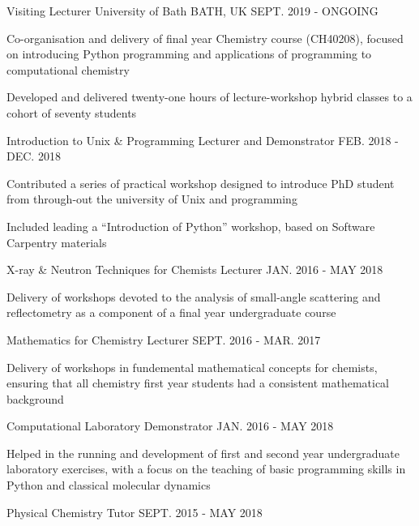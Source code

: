 \begin{cventries}
	\cventry
	{Visiting Lecturer}
	{University of Bath}
	{BATH, UK}
	{SEPT. 2019 - ONGOING}
	{
		\begin{cvitems}
			\item {Co-organisation and delivery of final year Chemistry course (CH40208), focused on introducing Python programming and applications of programming to computational chemistry}
			\item {Developed and delivered twenty-one hours of lecture-workshop hybrid classes to a cohort of seventy students}
		\end{cvitems}
	}
	\cventry
	{Introduction to Unix \& Programming Lecturer and Demonstrator}
	{}
	{}
	{FEB. 2018 - DEC. 2018}
	{
		\begin{cvitems}
			\item {Contributed a series of practical workshop designed to introduce PhD student from through-out the university of Unix and programming}
			\item {Included leading a ``Introduction of Python'' workshop, based on Software Carpentry materials}
		\end{cvitems}
	}
	\cventry
	{X-ray \& Neutron Techniques for Chemists Lecturer}
	{}
	{}
	{JAN. 2016 - MAY 2018}
	{
		\begin{cvitems}
			\item {Delivery of workshops devoted to the analysis of small-angle scattering and reflectometry as a component of a final year undergraduate course}
		\end{cvitems}
	}
	\cventry
	{Mathematics for Chemistry Lecturer}
	{}
	{}
	{SEPT. 2016 - MAR. 2017}
	{
		\begin{cvitems}
			\item {Delivery of workshops in fundemental mathematical concepts for chemists, ensuring that all chemistry first year students had a consistent mathematical background}
		\end{cvitems}
	}
	\cventry
	{Computational Laboratory Demonstrator}
	{}
	{}
	{JAN. 2016 - MAY 2018}
	{
		\begin{cvitems}
			\item {Helped in the running and development of first and second year undergraduate laboratory exercises, with a focus on the teaching of basic programming skills in Python and classical molecular dynamics}
		\end{cvitems}
	}
	\cventry
	{Physical Chemistry Tutor}
	{}
	{}
	{SEPT. 2015 - MAY 2018}
	{
		\begin{cvitems}

\end{cvitems}}
\end{cventries}
